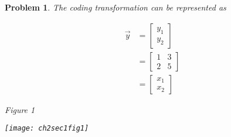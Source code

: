 \documentclass{article}
\newtheorem{problem}{Problem}
\begin{document}
\begin{problem}
The coding transformation can be represented as

\begin{align*}
\vec{y} 
&= \begin{bmatrix} y_{1} \\ y_{2} \end{bmatrix} \\
&= \begin{bmatrix} 1 & 3 \\ 2 & 5  \end{bmatrix} \\
&= \begin{bmatrix} x_{1} \\ x_{2} \end{bmatrix}
\end{align*}

Figure 1

\texttt{[image: ch2sec1fig1]}

\end{problem}
\end{document}
